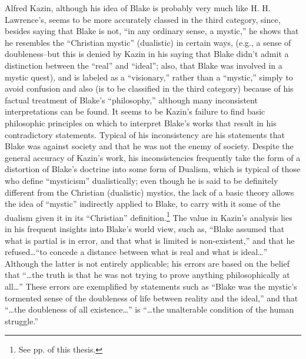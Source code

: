 Alfred Kazin,\supercite{kazin:portable-blake}
although his idea of Blake is probably very much like H. H. Lawrence's, seems to be more accurately
classed in the third category, since, besides saying that Blake is not, \enquote{in any ordinary sense, a mystic,}\supercite{kazin:portable-blake}
he shows that he resembles the \enquote{Christian mystic} (dualistic) in certain ways, (e.g., a sense of doubleness--but this is denied
by Kazin in his saying that Blake didn't admit a distinction between the \enquote{real} and \enquote{ideal}; also, that Blake was
involved in a mystic quest), and is labeled as a \enquote{visionary,} rather than a \enquote{mystic,} simply to avoid confusion and also
(is to be classified in the third category) because of his factual treatment of Blake's \enquote{philosophy,} although many inconsistent
interpretations can be found. It seems to be Kazin's failure to find basic philosophic principles on which to interpret Blake's works that
result in his contradictory statements. Typical of his inconsistency are his statements that Blake was against society\supercite{kazin:portable-blake}
and that he was not the enemy of society.\supercite{kazin:portable-blake}
Despite the general accuracy of Kazin's work, his inconsistencies frequently take the form of a
distortion of Blake's doctrine into some form of Dualism, which is typical of those who define \enquote{mysticism} dualistically;
even though he is said to be definitely different from the Christian (dualistic) mystics, the lack of a basic theory
allows the idea of \enquote{mystic} indirectly applied to Blake, to carry with it some of the dualism given it in its \enquote{Christian}
definition.\footnote{See pp. \pageref{self:15} of this thesis.}
The value in Kazin's analysis lies in his frequent insights into Blake's world view, such as, \enquote{Blake
assumed that what is partial is in error, and that what is limited is non-existent,}\supercite{kazin:portable-blake}
and that he refused\dots\enquote{to concede a distance between what is real and what is ideal\dots}\supercite{kazin:portable-blake}
Although the latter is not entirely applicable; his errors are based
on the belief that \enquote{\dots the truth is that he was not trying to prove anything philosophically at all\dots}\supercite{kazin:portable-blake}
These errors are exemplified by statements such as \enquote{Blake was the mystic's tormented sense of the doubleness of life between reality and the ideal,}\supercite{kazin:portable-blake}
and that \enquote{\dots the doubleness of all existence\dots} is \enquote{\dots the unalterable condition of the human struggle.}\supercite{kazin:portable-blake}

